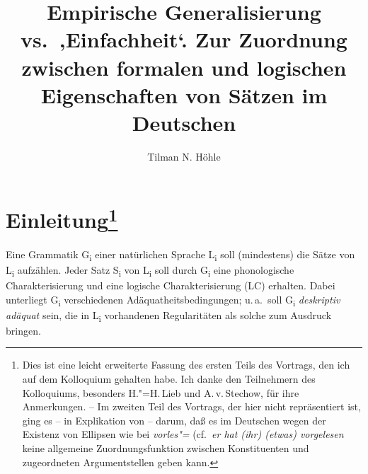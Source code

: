\documentclass[output=paper]{langsci/langscibook}
\author{Tilman N. Höhle}
\title{Empirische Generalisierung vs.\ ,Einfachheit‘. Zur Zuordnung\newlineTOC{} zwischen formalen und logischen Eigenschaften von Sätzen im\newlineTOC{} Deutschen}
\begin{document}
\label{chap-empirische-generalisierungen}

\renewcommand*{\thefootnote}{\fnsymbol{footnote}}
\setcounter{footnote}{4}


\setcounter{footnote}{0}

\setcounter{section}{-1}
\section[Einleitung]{Einleitung\protect\footnote{Dies ist eine leicht erweiterte Fassung des ersten
    Teils des Vortrags, den ich auf dem Kolloquium 
    gehalten habe. Ich danke den Teilnehmern des Kolloquiums, besonders H."=H.\,Lieb und
    A.\,v.\,Stechow, für ihre Anmerkungen. -- Im zweiten Teil des Vortrags, der hier nicht
    repräsentiert ist, ging es -- in Explikation von \citet[17 Fn.\,1]{Hoehle78a} -- darum, daß es
    im Deutschen wegen der Existenz von Ellipsen wie bei \textit{vorles"=} (cf.\ \textit{er hat
      (ihr) (etwas) vorgelesen} keine allgemeine Zuordnungsfunktion zwischen Konstituenten und
    zugeordneten Argumentstellen geben kann.}
}%
\label{sec:2-0}

\renewcommand*{\thefootnote}{\arabic{footnote}}
\setcounter{footnote}{0}

Eine Grammatik G\textsubscript{i} einer natürlichen Sprache L\textsubscript{i} soll (mindestens) die Sätze von L\textsubscript{i} aufzählen. Jeder Satz S\textsubscript{i} von L\textsubscript{i} soll durch G\textsubscript{i} eine phonologische Charakterisierung und eine logische Charakterisierung (LC) erhalten. Dabei unterliegt G\textsubscript{i} verschiedenen Adäquatheitsbedingungen; u.\,a.\  soll G\textsubscript{i} \textit{deskriptiv adäquat} sein, \dash die in L\textsubscript{i} vorhandenen Regularitäten als solche zum Ausdruck bringen.
\end{document}
